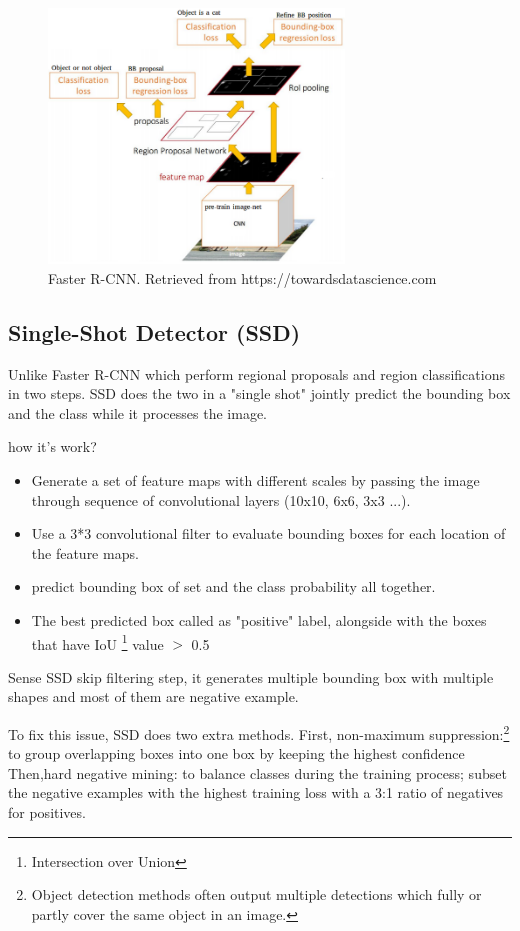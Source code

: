 \documentclass[12pt]{report}
\begin{document}
\begin{figure}[h]
    \centering
    \includegraphics[width=0.7\textwidth]{./images/frcnn.png}
    \caption{Faster R-CNN. Retrieved from https://towardsdatascience.com}
    \label{fig:frcnn}
\end{figure} 

\subsection{Single-Shot Detector (SSD)}

Unlike Faster R-CNN which perform regional proposals 
and region classifications in two steps. SSD does the two in a "single shot"
jointly predict the bounding box and the class while it processes the image.

how it's work?
\begin{itemize}
    \item Generate a set of feature maps with different scales 
    by passing the image through sequence of convolutional layers (10x10, 6x6, 3x3 ...).
    \item Use a 3*3 convolutional filter to evaluate bounding boxes for each location of the feature maps.
    \item predict bounding box of set and the class probability all together.
    \item The best predicted box called as "positive" label, alongside with
    the boxes that have IoU \footnote{Intersection over Union } value $>$ 0.5 
\end{itemize}
Sense SSD skip filtering step, it generates multiple bounding box with multiple shapes
and most of them are negative example.

To fix this issue, SSD does two extra methods.
First, non-maximum suppression:\footnote{Object detection methods often output multiple detections which fully or partly cover the same object in an image.}
to group overlapping boxes into one box by keeping the highest confidence
Then,hard negative mining: to balance classes during the training process; subset the negative examples 
with the highest training loss with a 3:1 ratio of negatives for positives.\cite{Liu2016}
\end{document}
